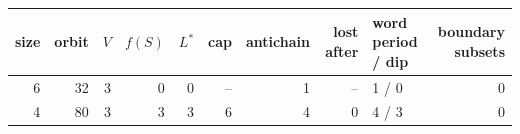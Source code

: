 \begin{tabular}{rrrrrrrrlr}
\toprule
size & orbit & $V$ & $f(S)$ & $L^\ast$ & cap & antichain & lost after & word period / dip & boundary subsets\\
\midrule
6 & 32 & $3$ & 0 & 0 & -- & 1 & -- & 1 / 0 & 0\\
4 & 80 & $3$ & 3 & 3 & 6 & 4 & 0 & 4 / 3 & 0\\
\bottomrule
\end{tabular}
